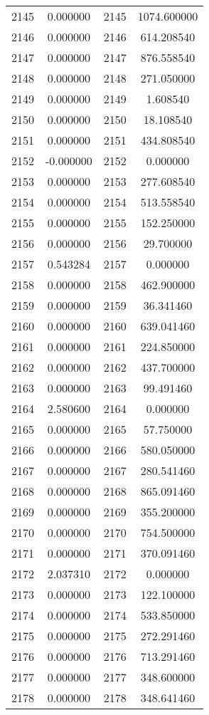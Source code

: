 \documentclass[12pt]{article}
\begin{document}
\begin{longtable}{@{}cccc@{}}
2145 & 0.000000 & 2145 & 1074.600000 \\
2146 & 0.000000 & 2146 & 614.208540 \\
2147 & 0.000000 & 2147 & 876.558540 \\
2148 & 0.000000 & 2148 & 271.050000 \\
2149 & 0.000000 & 2149 & 1.608540 \\
2150 & 0.000000 & 2150 & 18.108540 \\
2151 & 0.000000 & 2151 & 434.808540 \\
2152 & -0.000000 & 2152 & 0.000000 \\
2153 & 0.000000 & 2153 & 277.608540 \\
2154 & 0.000000 & 2154 & 513.558540 \\
2155 & 0.000000 & 2155 & 152.250000 \\
2156 & 0.000000 & 2156 & 29.700000 \\
2157 & 0.543284 & 2157 & 0.000000 \\
2158 & 0.000000 & 2158 & 462.900000 \\
2159 & 0.000000 & 2159 & 36.341460 \\
2160 & 0.000000 & 2160 & 639.041460 \\
2161 & 0.000000 & 2161 & 224.850000 \\
2162 & 0.000000 & 2162 & 437.700000 \\
2163 & 0.000000 & 2163 & 99.491460 \\
2164 & 2.580600 & 2164 & 0.000000 \\
2165 & 0.000000 & 2165 & 57.750000 \\
2166 & 0.000000 & 2166 & 580.050000 \\
2167 & 0.000000 & 2167 & 280.541460 \\
2168 & 0.000000 & 2168 & 865.091460 \\
2169 & 0.000000 & 2169 & 355.200000 \\
2170 & 0.000000 & 2170 & 754.500000 \\
2171 & 0.000000 & 2171 & 370.091460 \\
2172 & 2.037310 & 2172 & 0.000000 \\
2173 & 0.000000 & 2173 & 122.100000 \\
2174 & 0.000000 & 2174 & 533.850000 \\
2175 & 0.000000 & 2175 & 272.291460 \\
2176 & 0.000000 & 2176 & 713.291460 \\
2177 & 0.000000 & 2177 & 348.600000 \\
2178 & 0.000000 & 2178 & 348.641460 \\

\end{longtable}
\end{document}
